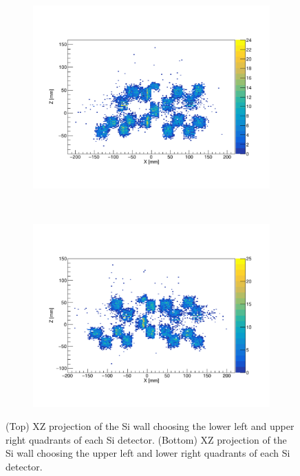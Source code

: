 \documentclass[final,number,sort&compress,5p,times,twocolumn]{elsarticle}
\begin{document}
\begin{figure}[hbt!]
	\centering
	\begin{subfigure}{.5\textwidth}
  		\centering
  		\includegraphics[width=\linewidth]{figures/TexATTracksForwardSi_corners1}
	\end{subfigure}%
	\\
	\begin{subfigure}{.5\textwidth}
  		\centering
  		\includegraphics[width=\linewidth]{figures/TexATTracksForwardSi_corners2}
	\end{subfigure}
	\caption{(Top) XZ projection of the Si wall choosing the lower left and upper right quadrants of each Si detector. (Bottom) XZ projection of the Si wall choosing the upper left and lower right quadrants of each Si detector.}
	\label{fig:TexATTracksForwardSi_Corners}
\end{figure}
\end{document}
